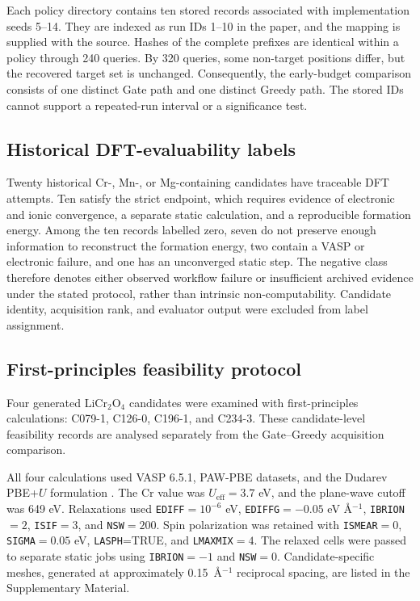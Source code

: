 Each policy directory contains ten stored records associated with
implementation seeds 5--14. They are indexed as run IDs 1--10 in the paper, and
the mapping is supplied with the source. Hashes of the complete prefixes are
identical within a policy through 240 queries. By 320 queries, some non-target
positions differ, but the recovered target set is unchanged. Consequently, the
early-budget comparison consists of one distinct Gate path and one distinct
Greedy path. The stored IDs cannot support a repeated-run interval or a
significance test.

\subsection{Historical DFT-evaluability labels}

Twenty historical Cr-, Mn-, or Mg-containing candidates have traceable DFT
attempts. Ten satisfy the strict endpoint, which requires evidence of
electronic and ionic convergence, a separate static calculation, and a
reproducible formation energy. Among the ten records labelled zero, seven do
not preserve enough information to reconstruct the formation energy, two
contain a VASP or electronic failure, and one has an unconverged static step.
The negative class therefore denotes either observed workflow failure or
insufficient archived evidence under the stated protocol, rather than intrinsic
non-computability.
Candidate identity, acquisition rank, and evaluator output were excluded from
label assignment.

\subsection{First-principles feasibility protocol}

Four generated LiCr$_2$O$_4$ candidates were examined with first-principles
calculations: C079-1, C126-0, C196-1, and C234-3. These candidate-level
feasibility records are analysed separately from the Gate--Greedy acquisition
comparison.

All four calculations used VASP 6.5.1, PAW-PBE datasets, and the Dudarev
PBE+$U$ formulation \cite{ref-vasp,ref-paw,ref-paw-vasp,ref-pbe,ref-dudarev}.
The Cr value was $U_{\mathrm{eff}}=3.7$ eV, and the plane-wave cutoff was 649 eV.
Relaxations used \texttt{EDIFF}$=10^{-6}$ eV,
\texttt{EDIFFG}$=-0.05$ eV \AA$^{-1}$, \texttt{IBRION}$=2$,
\texttt{ISIF}$=3$, and \texttt{NSW}$=200$. Spin polarization was retained with
\texttt{ISMEAR}$=0$, \texttt{SIGMA}$=0.05$ eV, \texttt{LASPH}=TRUE, and
\texttt{LMAXMIX}$=4$. The relaxed cells were passed to separate static jobs
using \texttt{IBRION}$=-1$ and \texttt{NSW}$=0$. Candidate-specific meshes,
generated at approximately 0.15~\AA$^{-1}$ reciprocal spacing, are listed in the
Supplementary Material.

